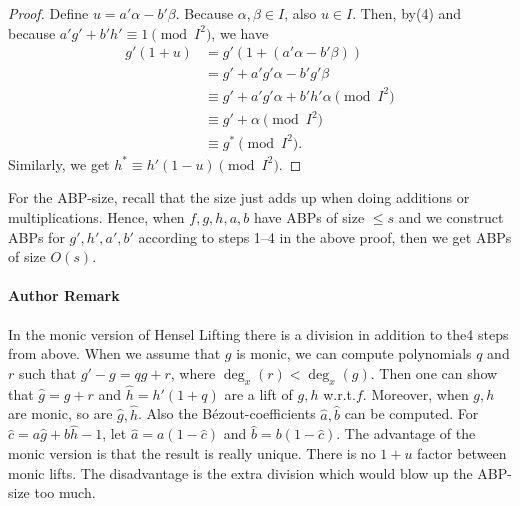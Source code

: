 \documentclass[10pt,a4paper]{article}
\begin{document}
\begin{proof}
Define $u=a'\alpha-b'\beta$. Because $\alpha,\beta\in I$, also $u\in I$. Then, by(4) and because $a'g'+b'h'\equiv1\pmod{I^2}$, we have
\begin{align*}g'(1+u)&=g'(1+(a'\alpha-b'\beta))\\&=g'+a'g'\alpha-b'g'\beta\\&\equiv g'+a'g'\alpha+b'h'\alpha\pmod{I^2}\\&\equiv g'+\alpha\pmod{I^2}\\&\equiv g^*\pmod{I^2}.\end{align*}
Similarly, we get $h^*\equiv h'(1-u)\pmod{I^2}$.
\end{proof}
For the ABP-size, recall that the size just adds up when doing additions or multiplications. Hence, when $f,g,h,a,b$ have ABPs of size $\leq s$ and we construct ABPs for $g',h',a',b'$ according to steps 1--4 in the above proof, then we get ABPs of size $O(s)$.
\paragraph{Author Remark}
In the monic version of Hensel Lifting there is a division in addition to the4 steps from above. When we assume that $g$ is monic, we can compute polynomials $q$ and $r$ such that $g'-g=qg+r$, where $\deg_x(r)<\deg_x(g)$. Then one can show that $\widehat g=g+r$ and $\widehat h=h'(1+q)$ are a lift of $g,h$ w.r.t.$f$. Moreover, when $g,h$ are monic, so are $\widehat g,\widehat h$. Also the B\'ezout-coefficients $\widehat a,\widehat b$ can be computed. For $\widehat c=a\widehat g+b\widehat h-1$, let $\widehat a=a(1-\widehat c)$ and $\widehat b=b(1-\widehat c)$.
The advantage of the monic version is that the result is really unique. There is no $1+u$ factor between monic lifts. The disadvantage is the extra division which would blow up the ABP-size too much.
\end{document}
